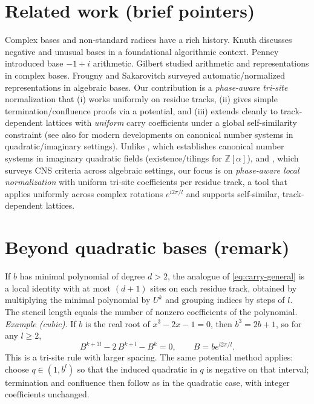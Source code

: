 \documentclass[11pt]{article}
\theoremstyle{definition}
\theoremstyle{remark}
\newcommand{\Z}{\mathbb{Z}}
\begin{document}
\section{Related work (brief pointers)}
Complex bases and non-standard radices have a rich history.
Knuth \cite{Knuth1997} discusses negative and unusual bases in a foundational algorithmic context.
Penney \cite{Penney1965} introduced base $-1+i$ arithmetic.
Gilbert \cite{Gilbert1981,Gilbert1983} studied arithmetic and representations in complex bases.
Frougny and Sakarovitch \cite{FrougnySakarovitch1992} surveyed automatic/normalized representations in algebraic bases.
Our contribution is a \emph{phase-aware tri-site} normalization that (i) works uniformly on residue tracks, (ii) gives simple termination/confluence proofs via a potential, and (iii) extends cleanly to track-dependent lattices with \emph{uniform} carry coefficients under a global self-similarity constraint
(see also \cite{Heuberger2007,AkiyamaPetho2011} for modern developments on canonical number systems in quadratic/imaginary settings).
Unlike \cite{Heuberger2007}, which establishes canonical number systems in imaginary quadratic fields (existence/tilings for $\Z[\alpha]$), and \cite{AkiyamaPetho2011}, which surveys CNS criteria across algebraic settings, our focus is on \emph{phase-aware local normalization} with uniform tri-site coefficients per residue track, a tool that applies uniformly across complex rotations $e^{i2\pi/l}$ and supports self-similar, track-dependent lattices.

\section{Beyond quadratic bases (remark)}
If $b$ has minimal polynomial of degree $d>2$, the analogue of \eqref{eq:carry-general} is a local identity with at most $(d{+}1)$ sites on each residue track, obtained by multiplying the minimal polynomial by $U^{k}$ and grouping indices by steps of $l$. The stencil length equals the number of nonzero coefficients of the polynomial.
\emph{Example (cubic).} If $b$ is the real root of $x^3-2x-1=0$, then $b^3=2b+1$, so for any $l\ge2$,
\[
B^{k+3l}-2\,B^{k+l}-B^{k}=0,\qquad B=be^{i2\pi/l}.
\]
This is a tri-site rule with larger spacing. The same potential method applies: choose $q\in(1,b^l)$ so that the induced quadratic in $q$ is negative on that interval; termination and confluence then follow as in the quadratic case, with integer coefficients unchanged.
\end{document}
